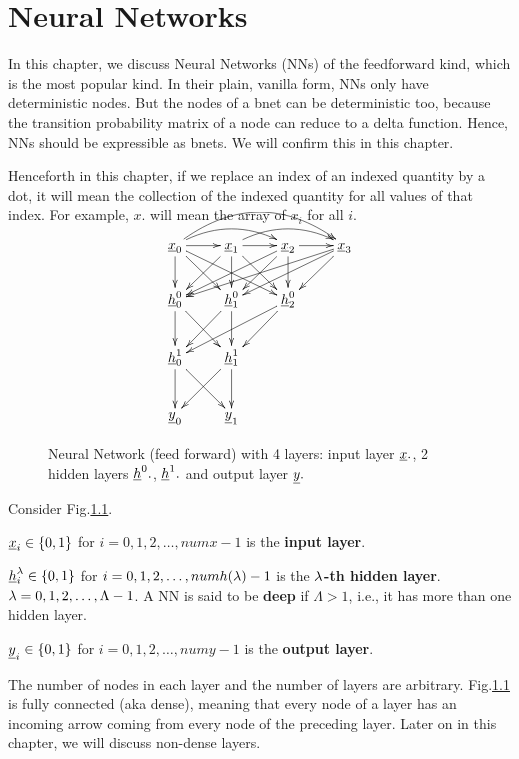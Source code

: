 \chapter{Neural Networks}

In this chapter, we discuss
 Neural Networks (NNs) of the
feedforward kind,
which is the most popular kind. In their
 plain, vanilla form, NNs only
have deterministic nodes.
But the nodes of a bnet can
be deterministic too, because
the transition probability matrix
of a node
can reduce to a delta function.
Hence, NNs should be expressible
as bnets. We will confirm this
in this chapter.

Henceforth in this chapter,
if we replace an index of an
indexed quantity by a dot, 
it will mean the collection
of the indexed quantity
for all values of that
index. For example, $x.$
will mean the 
array of $x_i$ for all $i$.


\begin{figure}[h!]
\centering
$$\xymatrix{
\rvx_0\ar@/^1pc/[rr]
\ar@/^2pc/[rrr]
\ar[d]\ar[dr]\ar[drr]\ar[r]&
\rvx_1\ar@/^1pc/[rr]
 \ar[dl]\ar[d]\ar[dr]\ar[r]&
\rvx_2\ar[dll]\ar[dl]\ar[d]\ar[r]&
\rvx_3\ar[dlll]\ar[dll]\ar[dl]\\
\rvh_0^0\ar[d]\ar[dr]&
\rvh_1^0\ar[dl]\ar[d]&
\rvh_2^0\ar[dll]\ar[dl]\\
\rvh_0^1\ar[d]\ar[dr]&
\rvh_1^1\ar[dl]\ar[d]\\
\rvy_0&
\rvy_1
}$$
\caption{Neural Network (feed forward)
with 4 layers: input layer ${\underline{x}}.$,
2 hidden layers ${\underline{h}}^0.$,
${\underline{h}}^1.$ and
output layer ${\underline{y}}.$ }
\label{fig-nn}
\end{figure}

Consider Fig.\ref{fig-nn}.

${\underline{x}}_i\in 
\{0,1\}$ for 
$i=0, 1, 2, \dots,numx-1$
is the \textbf{input layer}.

${\underline{h}}_i^\lambda\in 
\{0,1\}$ for 
$i=0, 1, 2, \dots,numh(\lambda)-1$
is the $\lambda$\textbf{-th hidden layer}.
$\lambda=0, 1, 2, \ldots, \Lambda-1$.
A NN is said to be {\bf deep} if
$\Lambda>1$, i.e., it has 
more than one hidden layer.

${\underline{y}}_i\in 
\{0,1\}$ for 
$i=0, 1, 2, \dots,numy-1$
is the \textbf{output layer}.

The number of nodes in each layer 
and the number of layers are arbitrary.
Fig.\ref{fig-nn} is fully connected 
(aka dense), meaning that every node
of a layer has an incoming
arrow coming 
from every node of the preceding
layer. Later on in this chapter,
we will
discuss non-dense layers.

